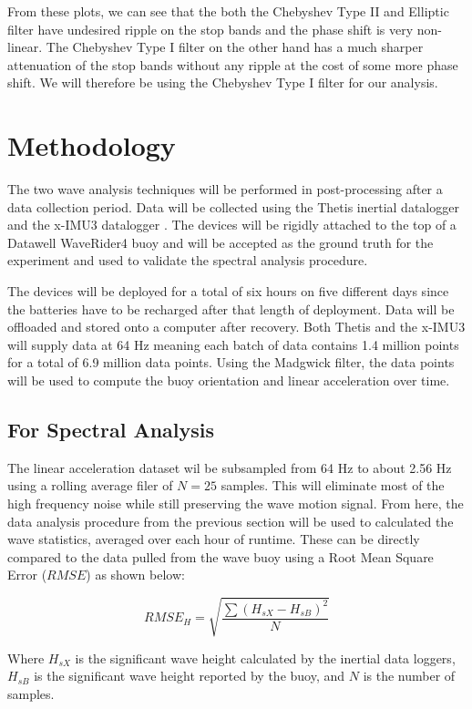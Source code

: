 From these plots, we can see that the both the Chebyshev Type II and Elliptic filter have undesired ripple on the stop bands and the phase shift is very non-linear. 
The Chebyshev Type I filter on the other hand has a much sharper attenuation of the stop bands without any ripple at the cost of some more phase shift. 
We will therefore be using the Chebyshev Type I filter for our analysis.

\section{Methodology}
The two wave analysis techniques will be performed in post-processing after a data collection period. 
Data will be collected using the Thetis inertial datalogger and the x-IMU3 datalogger \cite{xioTechnologies}. 
The devices will be rigidly attached to the top of a Datawell WaveRider4 buoy and will be accepted as the ground truth for the experiment and used to validate the spectral analysis procedure.

The devices will be deployed for a total of six hours on five different days since the batteries have to be recharged after that length of deployment. 
Data will be offloaded and stored onto a computer after recovery. 
Both Thetis and the x-IMU3 will supply data at 64 Hz meaning each batch of data contains 1.4 million points for a total of 6.9 million data points. 
Using the Madgwick filter, the data points will be used to compute the buoy orientation and linear acceleration over time.

\subsection{For Spectral Analysis}
The linear acceleration dataset wil be subsampled from 64 Hz to about 2.56 Hz using a rolling average filer of $N=25$ samples. 
This will eliminate most of the high frequency noise while still preserving the wave motion signal. 
From here, the data analysis procedure from the previous section will be used to calculated the wave statistics, averaged over each hour of runtime. 
These can be directly compared to the data pulled from the wave buoy using a Root Mean Square Error ($RMSE$) as shown below:

\begin{equation}
    RMSE_H = \sqrt{\frac{\sum{(H_{sX}-H_{sB})^2}}{N}}
\end{equation}

Where $H_{sX}$ is the significant wave height calculated by the inertial data loggers, $H_{sB}$ is the significant wave height reported by the buoy, and $N$ is the number of samples.

